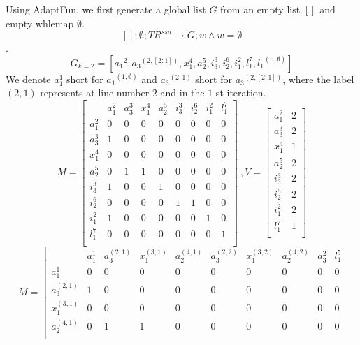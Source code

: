 \documentclass[a4paper,11pt]{article}
\newcommand{\THESYSTEM}{\textsf{AdaptFun}}
\begin{document}
\begin{example}
{
Using \THESYSTEM, we first generate a global list $G$ from an empty list $[]$ and empty whlemap $\emptyset$.
 \[[]; \emptyset; TR^{ssa} \to G; w  \land w = \emptyset\].
 \[G_{k=2} = \left[
  {a_1}^2 , {a_3}^{(2,[2:1])} , x_1^{4} , a_2^{5} ,  i_3^{3} , 
  i_2^{6}, i_1^{2} , l_1^{7} , {l_1}^{(5,\emptyset)}   \right] \]
  We denote $a_1^{1}$ short for ${a_1}^{(1,\emptyset)}$ and ${a_3}^{(2,1)}$ short for ${a_3}^{(2,[2:1])}$, where the label $(2, 1)$ represents at line number $2$ and in the $1$ st iteration.
  } 
\[
{
M =  \left[ \begin{matrix}
 & a_1^{2} & a_3^{3} & x_1^{4} 
 & a_2^{5}  & i_3^{3} & i_2^{6} & i_1^{2} & l_1^{7}\\
a_1^{2} & 0 & 0 & 0 & 0 & 0 & 0 & 0 & 0  \\
a_3^{3} & 1 & 0 & 0 & 0 & 0 & 0 & 0 & 0 \\
x_1^{4} & 0 & 0 & 0 & 0 & 0 & 0 & 0 & 0 \\
a_2^{5} & 0 & 1 & 1 & 0 & 0 & 0 & 0 & 0 \\
i_3^{3} & 1 & 0 & 0 & 1 & 0 & 0 & 0 & 0 \\
i_2^{6} & 0 & 0 & 0 & 0 & 1 & 1 & 0 & 0 \\
i_1^{2} & 1 & 0 & 0 & 0 & 0 & 0 & 1 & 0 \\
l_1^{7} & 0 & 0 & 0 & 0 & 0 & 0 & 0 & 1 \\
 \end{matrix} \right] 
~ , V = \left [ \begin{matrix}
a_1^{2} & 2   \\
a_3^{3} & 2  \\
x_1^{4} & 1  \\
a_2^{5} & 2  \\
i_3^{3} & 2  \\
i_2^{6} & 2  \\
i_1^{2} & 2  \\
l_1^{7} & 1 \\
\end{matrix} \right ]
}
\]
\[
{
M =  \left[ \begin{matrix}
 & a_1^{1} & a_3^{(2,1)} & x_1^{(3,1)} & a_2^{(4,1)}  & a_3^{(2,2)} & x_1^{(3,2)} & a_2^{(4,2)} & a_3^{2} & l_1^{5}\\
 a_1^{1} & 0 & 0 & 0 & 0 & 0 & 0 & 0 &0 &0 \\
a_3^{(2,1)} & 1 & 0 & 0 & 0 & 0 & 0 & 0&0&0\\
x_1^{(3,1)} & 0 & 0 & 0 & 0 & 0 & 0& 0& 0 &0\\
a_2^{(4,1)} & 0 & 1 & 1 & 0 & 0 & 0 & 0& 0&0\\

\end{matrix}}\]
\end{example}
\end{document}
